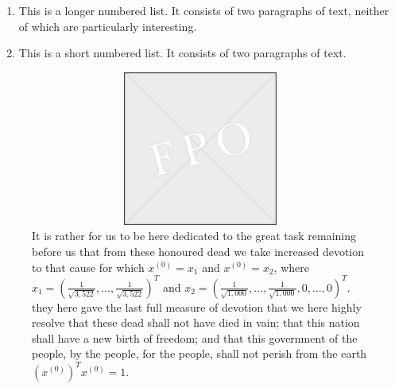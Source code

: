 \documentclass{pasa}%
\begin{document}
\begin{enumerate}%
\item This is a longer numbered list. It consists of two paragraphs of text, neither of which are particularly interesting.
\item This is a short numbered list. It consists of two paragraphs of text.
\end{enumerate}


\begin{figure}
\begin{center}
\includegraphics[width=30pc, height=12pc]{fpo.eps}
\caption{It is rather for us to be here dedicated to the great task remaining before us  that from these honoured dead we take increased devotion to that cause for which $x^{(0)}=x_1$ and $x^{(0)}=x_2$, where $x_1=(\frac{1}{\sqrt{3,522}},\dots,\frac{1}{\sqrt{3,522}})^T$ and $x_2=(\frac{1}{\sqrt{1,000}}, \dots, \frac{1}{\sqrt{1,000}},0,\dots,0)^T $. they here gave the last full measure of devotion  that we here highly resolve that these dead shall not have died in vain; that this nation shall have a new birth of freedom; and that this government of the people, by the people, for the people, shall not perish from the earth $(x^{(0)})^Tx^{(0)}=1$.}
 \label{Fig11}
\end{center}
\end{figure}
\end{document}
